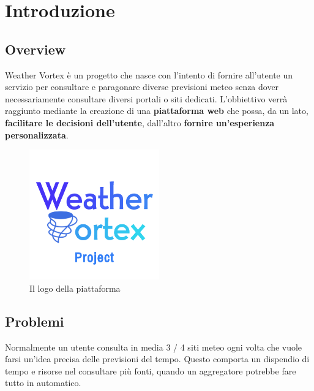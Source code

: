 

\chapter{Introduzione}


\section{Overview}
Weather Vortex è un progetto che nasce con l'intento di fornire all'utente un servizio per consultare e paragonare diverse previsioni meteo senza dover necessariamente consultare diversi portali o siti dedicati. L'obbiettivo verrà raggiunto mediante la creazione di una \textbf{piattaforma web} che possa, da un lato, \textbf{facilitare le decisioni dell'utente}, dall'altro \textbf{fornire un'esperienza personalizzata}.

\begin{figure}[H]
    \caption{Il logo della piattaforma}
    \label{fig:Logo}
    \centering
    \includegraphics[width=0.5\textwidth]{Images/logo.png}
\end{figure}

\section{Problemi}
Normalmente un utente consulta in media 3 / 4 siti meteo ogni volta che vuole farsi un'idea precisa delle previsioni del tempo. Questo comporta un dispendio di tempo e risorse nel consultare più fonti, quando un aggregatore potrebbe fare tutto in automatico.

